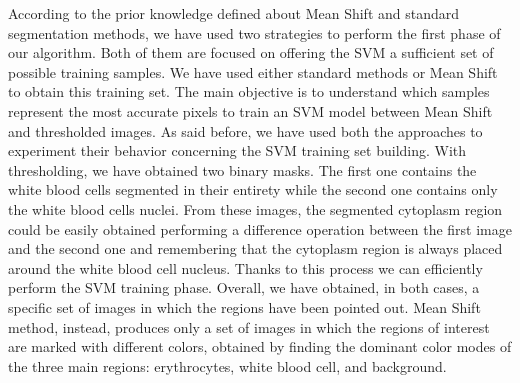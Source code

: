{	%
	According to the prior knowledge defined about Mean Shift and standard segmentation methods, we have used two strategies to perform the first phase of our algorithm. Both of them are focused on offering the SVM a sufficient set of possible training samples. We have used either standard methods or Mean Shift to obtain this training set. The main objective is to understand which samples represent the most accurate pixels to train an SVM model between Mean Shift and thresholded images. As said before, we have used both the approaches to experiment their behavior concerning the SVM training set building. With thresholding, we have obtained two binary masks. The first one contains the white blood cells segmented in their entirety while the second one contains only the white blood cells nuclei.
	From these images, the segmented cytoplasm region could be easily obtained performing a difference operation between the first image and the second one and remembering that the cytoplasm region is always placed around the white blood cell nucleus. Thanks to this process we can efficiently perform the SVM training phase. Overall, we have obtained, in both cases, a specific set of images in which the regions have been pointed out. Mean Shift method, instead, produces only a set of images in which the regions of interest are marked with different colors, obtained by finding the dominant color modes of the three main regions: erythrocytes, white blood cell, and background. 
	
}
